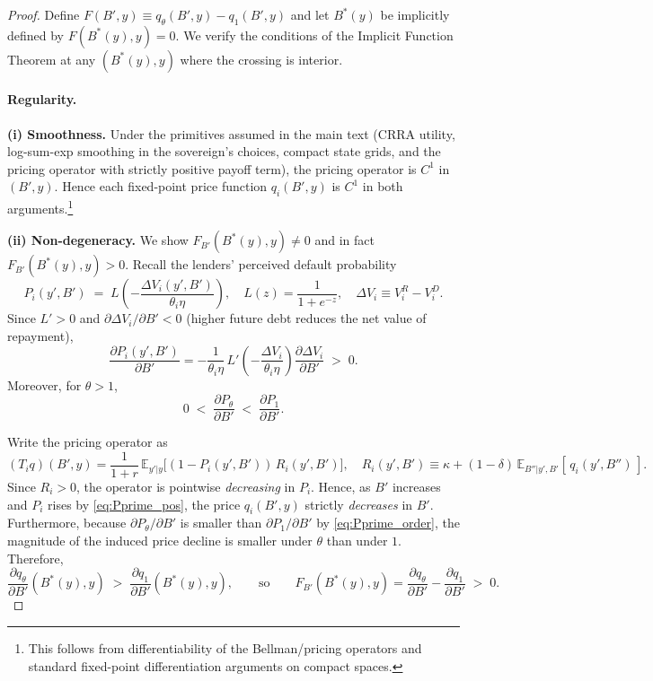 \documentclass[12pt]{article}
\theoremstyle{plain}
\newcommand{\E}{\mathbb{E}}
\begin{document}
\begin{proof}
	Define \(F(B',y)\equiv q_\theta(B',y)-q_1(B',y)\) and let \(B^*(y)\) be implicitly defined by \(F(B^*(y),y)=0\).
	We verify the conditions of the Implicit Function Theorem at any \((B^*(y),y)\) where the crossing is interior.

	\paragraph{Regularity.}
	\textbf{(i) Smoothness.} Under the primitives assumed in the main text (CRRA utility, log-sum-exp smoothing in the sovereign’s choices, compact state grids, and the pricing operator with strictly positive payoff term), the pricing operator is \(C^1\) in \((B',y)\). Hence each fixed-point price function \(q_i(B',y)\) is \(C^1\) in both arguments.\footnote{This follows from differentiability of the Bellman/pricing operators and standard fixed-point differentiation arguments on compact spaces.}

	\textbf{(ii) Non-degeneracy.} We show \(F_{B'}(B^*(y),y)\neq 0\) and in fact \(F_{B'}(B^*(y),y)>0\).
	Recall the lenders’ perceived default probability
	\[
		P_i(y',B') \;=\; L\!\left(-\frac{\Delta V_i(y',B')}{\theta_i\eta}\right),
		\quad L(z)=\frac{1}{1+e^{-z}},\quad
		\Delta V_i \equiv V_i^R - V_i^D.
	\]
	Since \(L'>0\) and \(\partial\Delta V_i/\partial B' < 0\) (higher future debt
	reduces the net value of repayment),
	\begin{equation}
		\frac{\partial P_i(y',B')}{\partial B'}
		= -\frac{1}{\theta_i\eta}\,L'\!\left(-\frac{\Delta V_i}{\theta_i\eta}\right)\frac{\partial \Delta V_i}{\partial B'} \;>\; 0.
		\label{eq:Pprime_pos}
	\end{equation}
	Moreover, for \(\theta>1\),
	\begin{equation}
		0 \;<\; \frac{\partial P_\theta}{\partial B'} \;<\; \frac{\partial P_1}{\partial B'}.
		\label{eq:Pprime_order}
	\end{equation}

	Write the pricing operator as
	\[
		(T_i q)(B',y)=\frac{1}{1+r}\,\E_{y'|y}\!\Big[(1-P_i(y',B'))\,R_i(y',B')\Big],\quad
		R_i(y',B')\equiv \kappa+(1-\delta)\,\E_{B''|y',B'}[\,q_i(y',B'')\,].
	\]
	Since \(R_i>0\), the operator is pointwise \emph{decreasing} in \(P_i\). Hence,
	as \(B'\) increases and \(P_i\) rises by \eqref{eq:Pprime_pos}, the price
	\(q_i(B',y)\) strictly \emph{decreases} in \(B'\). Furthermore, because
	\(\partial P_\theta/\partial B'\) is smaller than \(\partial P_1/\partial B'\)
	by \eqref{eq:Pprime_order}, the magnitude of the induced price decline is
	smaller under \(\theta\) than under \(1\). Therefore,
	\begin{equation}
		\frac{\partial q_\theta}{\partial B'}(B^*(y),y)\;>\;\frac{\partial q_1}{\partial B'}(B^*(y),y),
		\qquad\text{so}\qquad
		F_{B'}(B^*(y),y)=\frac{\partial q_\theta}{\partial B'}-\frac{\partial q_1}{\partial B'}\;>\;0.
		\label{eq:denominator_sign_correct}
	\end{equation}


\end{proof}
\end{document}
